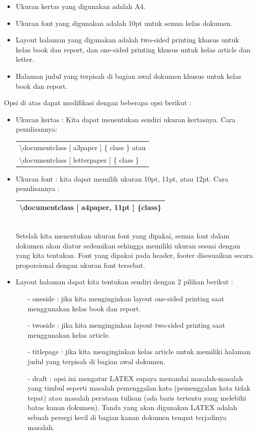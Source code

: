 \begin{itemize}
\item Ukuran kertas yang digunakan adalah A4.
\item Ukuran font yang digunakan adalah 10pt untuk semua kelas dokumen.
\item Layout halaman yang digunakan adalah two-sided printing khusus untuk kelas book dan report, dan one-sided printing khusus untuk kelas article dan letter.
\item  Halaman judul yang terpisah di bagian awal dokumen khusus untuk kelas book dan
report.
\end{itemize}
Opsi di atas dapat modifikasi dengan beberapa opsi berikut :
\begin{itemize}
\item Ukuran kertas : Kita dapat menentukan sendiri ukuran kertasnya. Cara penulisannya:\\[0.5 cm]
\begin{tabular}{|p{12 cm}|}
\hline
\textbackslash documentclass [ a3paper ] \{ class \} atau \\
\textbackslash documentclass [ letterpaper ] \{ class \}\\
\hline
\end{tabular}
\item Ukuran font : kita dapat memilih ukuran 10pt, 11pt, atau 12pt. Cara penulisannya :\\[0.5 cm]
 \begin{tabular}{|p{12 cm}|}
\hline
\textbackslash documentclass [ a4paper, 11pt ] \{class\}\\
\hline
\end{tabular}\\[0.5 cm]
Setelah kita menentukan ukuran font yang dipakai, semua font dalam dokumen akan diatur sedemikan sehingga memiliki ukuran sesuai dengan yang kita tentukan. Font yang dipakai pada header, footer disesuaikan secara proporsional dengan ukuran font tersebut.
\item Layout halaman dapat kita tentukan sendiri dengan 2 pilihan berikut :
\begin{itemize}
\item[-] oneside : jika kita menginginkan layout one-sided printing saat menggunakan kelas book dan report.
\item[-] twoside : jika kita menginginkan layout two-sided printing saat menggunakan kelas  article.
\item[-] titlepage : jika kita menginginkan kelas article untuk memiliki halaman judul yang          terpisah di bagian awal dokumen.
\item[-]draft : opsi ini mengatur LATEX supaya menandai masalah-masalah yang timbul seperti masalah pemenggalan kata (pemenggalan kata tidak tepat) atau masalah perataan tulisan (ada baris tertentu yang melebihi batas kanan dokumen). Tanda yang akan digunakan LATEX adalah sebuah persegi kecil di bagian kanan dokumen tempat terjadinya masalah.
\end{itemize}
\end{itemize}
